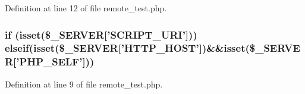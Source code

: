 Definition at line 12 of file remote\-\_\-test.\-php.

\hypertarget{remote__test_8php_a7e3c7052d9d98df94e744d4aab6c9dd5}{
\subsubsection[{elseif}]{\setlength{\rightskip}{0pt plus 5cm}if (isset(\$\-\_\-\-S\-E\-R\-V\-E\-R\mbox{[}'S\-C\-R\-I\-P\-T\-\_\-\-U\-R\-I'\mbox{]})) elseif(isset(\$\-\_\-\-S\-E\-R\-V\-E\-R\mbox{[}'H\-T\-T\-P\-\_\-\-H\-O\-S\-T'\mbox{]})\&\&isset(\$\-\_\-\-S\-E\-R\-V\-E\-R\mbox{[}'P\-H\-P\-\_\-\-S\-E\-L\-F'\mbox{]}))}}\label{remote__test_8php_a7e3c7052d9d98df94e744d4aab6c9dd5}


Definition at line 9 of file remote\-\_\-test.\-php.

